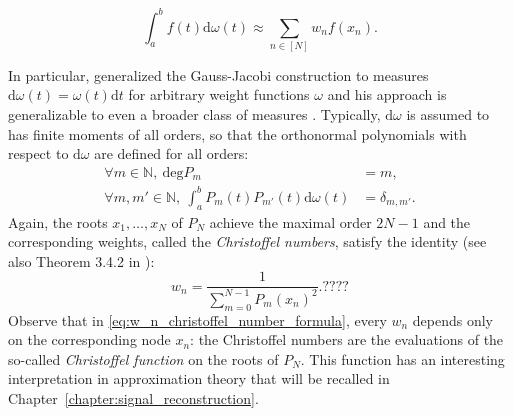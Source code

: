 \documentclass[twoside,11pt]{book}
\numberwithin{theorem}{chapter}
\numberwithin{definition}{chapter}
\numberwithin{proposition}{chapter}
\numberwithin{corollary}{chapter}
\numberwithin{example}{chapter}
\numberwithin{lemma}{chapter}
\begin{document}
\begin{equation}
\int_{a}^{b}f(t)\mathrm{d}\omega(t) \approx \sum\limits_{n \in [N]} w_{n}f(x_{n}).
\end{equation}


In particular, \cite{Chr1877} generalized the Gauss-Jacobi construction to 
measures $\mathrm{d}\omega(t) = \omega(t)\mathrm{d}t$ for arbitrary weight functions $\omega$ and his approach is generalizable to even a broader class of measures \citep{Gau81}. Typically, $\mathrm{d}\omega$ is assumed to has finite moments of all orders, so that the orthonormal polynomials with respect to $\mathrm{d}\omega$ are defined for all orders:
\begin{align}
\forall m \in \mathbb{N}, \: \mathrm{deg} P_{m} & = m, \\
\forall m,m' \in \mathbb{N}, \: \int_{a}^{b} P_{m}(t)P_{m'}(t) \mathrm{d}\omega(t) & = \delta_{m,m'}.
\end{align}
Again, the roots $x_{1}, \dots, x_{N}$ of $P_{N}$ achieve the maximal order $2N-1$ and the corresponding weights, 
called the \emph{Christoffel numbers}, satisfy the identity \citep{Sho29} (see also Theorem 3.4.2 in \citep{Sze39}): 
\begin{equation}\label{eq:w_n_christoffel_number_formula}
w_{n} = \frac{1}{\sum\limits_{m =0}^{N-1} P_{m}(x_{n})^{2}}. ????
\end{equation}
Observe that in \eqref{eq:w_n_christoffel_number_formula}, every $w_{n}$ depends only on the corresponding node $x_{n}$: the Christoffel numbers are the evaluations of  
the so-called \emph{Christoffel function} on the roots of $P_{N}$. This function has an interesting interpretation in approximation theory that will be recalled in Chapter~\ref{chapter:signal_reconstruction}.
\end{document}
